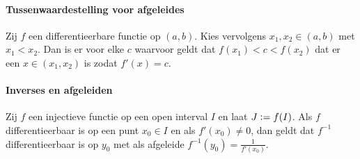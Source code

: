\paragraph{Tussenwaardestelling voor afgeleides} Zij $f$ een differentieerbare functie op $(a,b)$. Kies vervolgens $x_{1},x_{2}\in(a,b)$ met $x_{1}<x_{2}$. Dan is er voor elke $c$ waarvoor geldt dat $f(x_{1})<c<f(x_{2})$ dat er een $x\in(x_{1},x_{2})$ is zodat $f'(x)=c$.

\paragraph{Inverses en afgeleiden} Zij $f$ een injectieve functie op een open interval $I$ en laat $J\vcentcolon= f(I)$. Als $f$ differentieerbaar is op een punt $x_{0}\in I$ en als $f'(x_{0})\neq0$, dan geldt dat $f^{-1}$ differentieerbaar is op $y_{0}$ met als afgeleide $f^{-1}(y_{0})=\frac{1}{f'(x_{0})}$.
